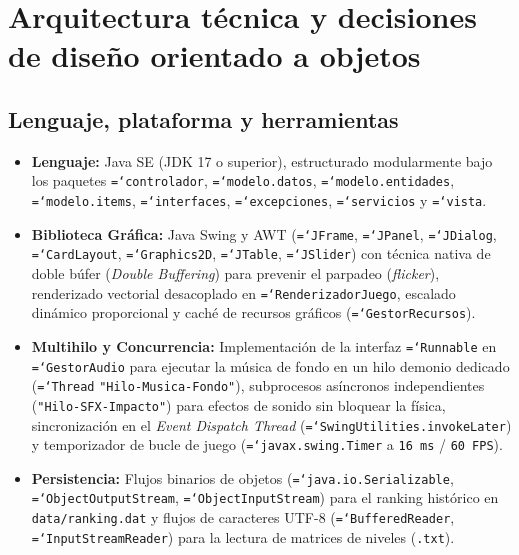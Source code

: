 \documentclass[12pt, a4paper]{article}
\DeclareRobustCommand{\code}[1]{\textcolor{codegreen}{\texttt{\hyphenchar\font=`\-#1}}}
\begin{document}
\section{Arquitectura técnica y decisiones de diseño orientado a objetos}

\subsection{Lenguaje, plataforma y herramientas}
\begin{itemize}[leftmargin=1.27cm]
    \item \textbf{Lenguaje:} Java SE (JDK 17 o superior), estructurado modularmente bajo los paquetes \code{controlador}, \code{modelo.datos}, \code{modelo.entidades}, \code{modelo.items}, \code{interfaces}, \code{excepciones}, \code{servicios} y \code{vista}.
    \item \textbf{Biblioteca Gráfica:} Java Swing y AWT (\code{JFrame}, \code{JPanel}, \code{JDialog}, \code{CardLayout}, \code{Graphics2D}, \code{JTable}, \code{JSlider}) con técnica nativa de doble búfer (\textit{Double Buffering}) para prevenir el parpadeo (\textit{flicker}), renderizado vectorial desacoplado en \code{RenderizadorJuego}, escalado dinámico proporcional y caché de recursos gráficos (\code{GestorRecursos}).
    \item \textbf{Multihilo y Concurrencia:} Implementación de la interfaz \code{Runnable} en \code{GestorAudio} para ejecutar la música de fondo en un hilo demonio dedicado (\code{Thread} \texttt{"Hilo-Musica-Fondo"}), subprocesos asíncronos independientes (\texttt{"Hilo-SFX-Impacto"}) para efectos de sonido sin bloquear la física, sincronización en el \textit{Event Dispatch Thread} (\code{SwingUtilities.invokeLater}) y temporizador de bucle de juego (\code{javax.swing.Timer} a \texttt{16 ms} / \texttt{60 FPS}).
    \item \textbf{Persistencia:} Flujos binarios de objetos (\code{java.io.Serializable}, \code{ObjectOutputStream}, \code{ObjectInputStream}) para el ranking histórico en \texttt{data/ranking.dat} y flujos de caracteres UTF-8 (\code{BufferedReader}, \code{InputStreamReader}) para la lectura de matrices de niveles (\texttt{.txt}).
\end{itemize}
\end{document}
